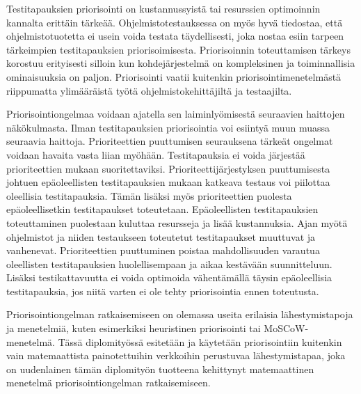   Testitapauksien priorisointi on kustannussyistä tai resurssien optimoinnin kannalta erittäin tärkeää.
  Ohjelmistotestauksessa on myös hyvä tiedostaa, että ohjelmistotuotetta ei usein voida testata täydellisesti, joka nostaa esiin tarpeen tärkeimpien testitapauksien priorisoimisesta.
  Priorisoinnin toteuttamisen tärkeys korostuu erityisesti silloin kun kohdejärjestelmä on kompleksinen ja toiminnallisia ominaisuuksia on paljon.
  Priorisointi vaatii kuitenkin priorisointimenetelmästä riippumatta ylimääräistä työtä ohjelmistokehittäjiltä ja testaajilta.

  Priorisointiongelmaa voidaan ajatella sen laiminlyömisestä seuraavien haittojen näkökulmasta.
  Ilman testitapauksien priorisointia voi esiintyä muun muassa seuraavia haittoja.
  Prioriteettien puuttumisen seurauksena tärkeät ongelmat voidaan havaita vasta liian myöhään.
  Testitapauksia ei voida järjestää prioriteettien mukaan suoritettaviksi.
  Prioriteettijärjestyksen puuttumisesta johtuen epäoleellisten testitapauksien mukaan katkeava testaus voi piilottaa oleellisia testitapauksia.
  Tämän lisäksi myös prioriteettien puolesta epäoleellisetkin testitapaukset toteutetaan.
  Epäoleellisten testitapauksien toteuttaminen puolestaan kuluttaa resursseja ja lisää kustannuksia.
  Ajan myötä ohjelmistot ja niiden testaukseen toteutetut testitapaukset muuttuvat ja vanhenevat.
  Prioriteettien puuttuminen poistaa mahdollisuuden varautua oleellisten testitapauksien huolellisempaan ja aikaa kestävään suunnitteluun.
  Lisäksi testikattavuutta ei voida optimoida vähentämällä täysin epäoleellisia testitapauksia, jos niitä varten ei ole tehty priorisointia ennen toteutusta.

  Priorisointiongelman ratkaisemiseen on olemassa useita erilaisia lähestymistapoja ja menetelmiä, kuten esimerkiksi heuristinen priorisointi tai MoSCoW-menetelmä.
  Tässä diplomityössä esitetään ja käytetään priorisointiin kuitenkin vain matemaattista painotettuihin verkkoihin perustuvaa lähestymistapaa, joka on uudenlainen tämän diplomityön tuotteena kehittynyt matemaattinen menetelmä priorisointiongelman ratkaisemiseen.
